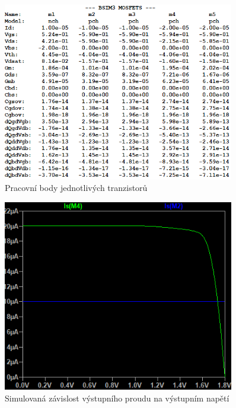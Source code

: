 \begin{figure}[h!]
    \centering
    \includegraphics[width=0.9\textwidth]{text/img/KPZ-op-OL.png}
    \caption{\label{fig:KPZ-op-OL} Pracovní body jednotlivých tranzistorů}
\end{figure}

\newpage

\begin{figure}[h!]
    \centering
    \includegraphics[width=0.9\textwidth]{text/img/KPZ-dc-graf.png}
    \caption{\label{fig:KPZ-dc-graf} Simulovaná závislost výstupního proudu na výstupním napětí}
\end{figure}

